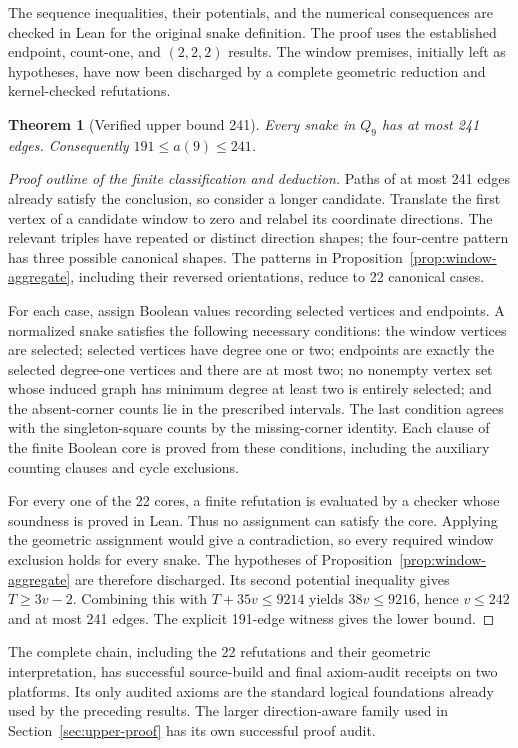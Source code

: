 \documentclass[11pt,a4paper]{article}
\newtheorem{theorem}{Theorem}[section]
\theoremstyle{definition}
\theoremstyle{remark}
\newcommand{\Q}{Q}
\begin{document}
The sequence inequalities, their potentials, and the numerical consequences are checked in Lean for the original snake definition. The proof uses the established endpoint, count-one, and $(2,2,2)$ results. The window premises, initially left as hypotheses, have now been discharged by a complete geometric reduction and kernel-checked refutations.

\begin{theorem}[Verified upper bound 241]\label{thm:upper241}
Every snake in $\Q_9$ has at most 241 edges. Consequently $191\le a(9)\le241$.
\end{theorem}
\begin{proof}[Proof outline of the finite classification and deduction]
Paths of at most 241 edges already satisfy the conclusion, so consider a longer candidate. Translate the first vertex of a candidate window to zero and relabel its coordinate directions. The relevant triples have repeated or distinct direction shapes; the four-centre pattern has three possible canonical shapes. The patterns in Proposition~\ref{prop:window-aggregate}, including their reversed orientations, reduce to 22 canonical cases.

For each case, assign Boolean values recording selected vertices and endpoints. A normalized snake satisfies the following necessary conditions: the window vertices are selected; selected vertices have degree one or two; endpoints are exactly the selected degree-one vertices and there are at most two; no nonempty vertex set whose induced graph has minimum degree at least two is entirely selected; and the absent-corner counts lie in the prescribed intervals. The last condition agrees with the singleton-square counts by the missing-corner identity. Each clause of the finite Boolean core is proved from these conditions, including the auxiliary counting clauses and cycle exclusions.

For every one of the 22 cores, a finite refutation is evaluated by a checker whose soundness is proved in Lean. Thus no assignment can satisfy the core. Applying the geometric assignment would give a contradiction, so every required window exclusion holds for every snake. The hypotheses of Proposition~\ref{prop:window-aggregate} are therefore discharged. Its second potential inequality gives $T\ge3v-2$. Combining this with $T+35v\le9214$ yields $38v\le9216$, hence $v\le242$ and at most 241 edges. The explicit 191-edge witness gives the lower bound.
\end{proof}
The complete chain, including the 22 refutations and their geometric interpretation, has successful source-build and final axiom-audit receipts on two platforms. Its only audited axioms are the standard logical foundations already used by the preceding results. The larger direction-aware family used in Section~\ref{sec:upper-proof} has its own successful proof audit.
\end{document}
